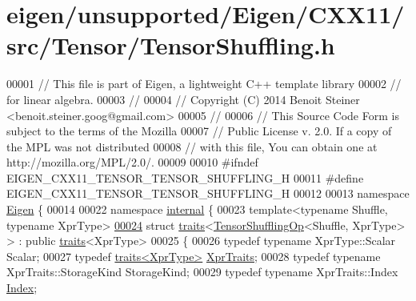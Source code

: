 \hypertarget{eigen_2unsupported_2_eigen_2_c_x_x11_2src_2_tensor_2_tensor_shuffling_8h_source}{}\section{eigen/unsupported/\+Eigen/\+C\+X\+X11/src/\+Tensor/\+Tensor\+Shuffling.h}
\label{eigen_2unsupported_2_eigen_2_c_x_x11_2src_2_tensor_2_tensor_shuffling_8h_source}

\begin{DoxyCode}
00001 \textcolor{comment}{// This file is part of Eigen, a lightweight C++ template library}
00002 \textcolor{comment}{// for linear algebra.}
00003 \textcolor{comment}{//}
00004 \textcolor{comment}{// Copyright (C) 2014 Benoit Steiner <benoit.steiner.goog@gmail.com>}
00005 \textcolor{comment}{//}
00006 \textcolor{comment}{// This Source Code Form is subject to the terms of the Mozilla}
00007 \textcolor{comment}{// Public License v. 2.0. If a copy of the MPL was not distributed}
00008 \textcolor{comment}{// with this file, You can obtain one at http://mozilla.org/MPL/2.0/.}
00009 
00010 \textcolor{preprocessor}{#ifndef EIGEN\_CXX11\_TENSOR\_TENSOR\_SHUFFLING\_H}
00011 \textcolor{preprocessor}{#define EIGEN\_CXX11\_TENSOR\_TENSOR\_SHUFFLING\_H}
00012 
00013 \textcolor{keyword}{namespace }\hyperlink{namespace_eigen}{Eigen} \{
00014 
00022 \textcolor{keyword}{namespace }\hyperlink{namespaceinternal}{internal} \{
00023 \textcolor{keyword}{template}<\textcolor{keyword}{typename} Shuffle, \textcolor{keyword}{typename} XprType>
\hyperlink{struct_eigen_1_1internal_1_1traits_3_01_tensor_shuffling_op_3_01_shuffle_00_01_xpr_type_01_4_01_4}{00024} \textcolor{keyword}{struct }\hyperlink{struct_eigen_1_1internal_1_1traits}{traits}<\hyperlink{class_eigen_1_1_tensor_shuffling_op}{TensorShufflingOp}<Shuffle, XprType> > : \textcolor{keyword}{public} 
      \hyperlink{struct_eigen_1_1internal_1_1traits}{traits}<XprType>
00025 \{
00026   \textcolor{keyword}{typedef} \textcolor{keyword}{typename} XprType::Scalar Scalar;
00027   \textcolor{keyword}{typedef} \hyperlink{struct_eigen_1_1internal_1_1traits}{traits<XprType>} \hyperlink{struct_eigen_1_1internal_1_1traits}{XprTraits};
00028   \textcolor{keyword}{typedef} \textcolor{keyword}{typename} XprTraits::StorageKind StorageKind;
00029   \textcolor{keyword}{typedef} \textcolor{keyword}{typename} XprTraits::Index \hyperlink{namespace_eigen_a62e77e0933482dafde8fe197d9a2cfde}{Index};

\end{DoxyCode}
